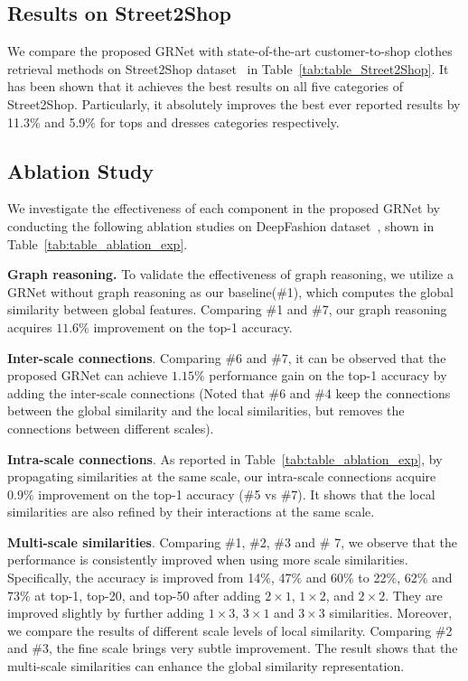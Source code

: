 \documentclass[10pt,twocolumn,letterpaper]{article}
\begin{document}
\subsection{Results on Street2Shop}
We compare the proposed GRNet with state-of-the-art customer-to-shop clothes retrieval methods on Street2Shop dataset~\cite{Kiapour2015} in Table~\ref{tab:table_Street2Shop}. It has been shown that it achieves the best results on all five categories of Street2Shop. Particularly, it absolutely improves the best ever reported results by 11.3\% and 5.9\% for tops and dresses categories respectively.


\subsection{Ablation Study}

We investigate the effectiveness of each component in the proposed GRNet by conducting the following ablation studies on DeepFashion dataset~\cite{Liu2016}, shown in Table~\ref{tab:table_ablation_exp}.

\textbf{Graph reasoning.} To validate the effectiveness of graph reasoning, we utilize a GRNet without graph reasoning as our baseline(\#1), which computes the global similarity between global features.
Comparing \#1 and \#7, our graph reasoning acquires $11.6\%$ improvement on the top-1 accuracy.

\textbf{Inter-scale connections}. Comparing \#6 and \#7, it can be observed that the proposed GRNet can achieve $1.15\%$ performance gain on the top-1 accuracy by adding the inter-scale connections (Noted that \#6 and \#4 keep the connections between the global similarity and the local similarities, but removes the connections between different scales).

\textbf{Intra-scale connections}. As reported in Table~\ref{tab:table_ablation_exp}, by propagating similarities at the same scale, our intra-scale connections acquire $0.9\%$ improvement on the top-1 accuracy (\#5 vs \#7).
It shows that the local similarities are also refined by their interactions at the same scale.


\textbf{Multi-scale similarities}. Comparing \#1, \#2, \#3 and \# 7, we observe that the performance is consistently improved when using more scale similarities. Specifically, the accuracy is improved from 14$\%$, 47$\%$ and 60$\%$ to 22$\%$, 62$\%$ and 73$\%$  at top-1, top-20, and top-50 after adding $2\times 1$, $1\times 2$, and $2\times 2$. They are improved slightly by further adding $1\times 3$, $3\times 1$ and $3\times 3$ similarities.
Moreover, we compare the results of different scale levels of local similarity. Comparing \#2 and \#3, the fine scale brings very subtle improvement.
The result shows that the multi-scale similarities can enhance the global similarity representation.
\end{document}
